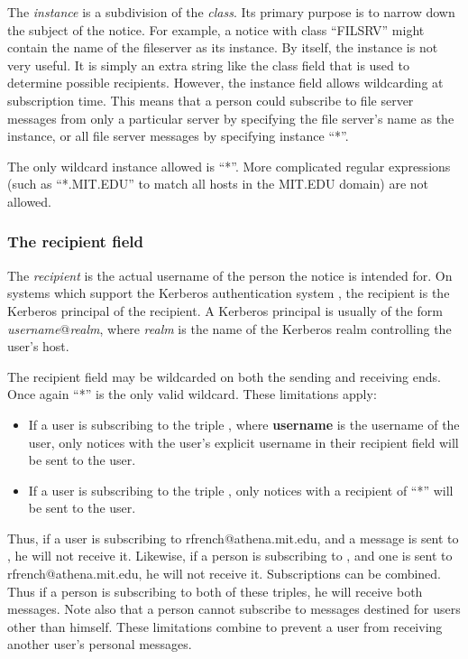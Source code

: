 The {\em instance\/} is a subdivision of the {\em class\/}.  Its primary
purpose is to narrow down the subject of the notice.  For example, a
notice with class ``FILSRV'' might contain the name of the fileserver
as its instance.  By itself, the instance is not very useful.  It is
simply an extra string like the class field that is used to determine
possible recipients.  However, the instance field allows wildcarding
at subscription time.  This means that a person could subscribe to
file server messages from only a particular server by specifying the
file server's name as the instance, or all file server messages by
specifying instance ``*''.

The only wildcard instance allowed is ``*''.  More complicated
regular expressions (such as ``*.MIT.EDU'' to match all hosts in the
MIT.EDU domain) are not allowed.

\subsubsection{The {\bf recipient} field}
\label{subscription-recipient}

The {\em recipient\/} is the actual username of the person the notice is
intended for.  On systems which support the Kerberos authentication
system \cite{kerberos-paper}, the recipient is the Kerberos principal
of the recipient.  A Kerberos principal is usually of the form {\em
username}@{\em realm}, where {\em realm\/} is the name of the
Kerberos realm controlling the user's host.

The recipient field may be wildcarded on both the sending and
receiving ends.  Once again ``*'' is the only valid wildcard.  These
limitations apply:

\begin{itemize}
\item If a user is subscribing to the triple , where {\bf username} is the username of
the user, only notices with the user's explicit username in their
recipient field will be sent to the user.

\item If a user is subscribing to the triple , only notices with a recipient of ``*'' will be
sent to the user.
\end{itemize}

Thus, if a user is subscribing to 
{rfrench@\sc athena.mit.edu}, and a message is sent to
, he will not receive it.  Likewise, if
a person is subscribing to
, and one is sent to  {rfrench@\sc athena.mit.edu}, he will not
receive it.  Subscriptions can be combined.  Thus if a person is
subscribing to both of these triples, he will receive both messages.
Note also that a person cannot subscribe to messages destined for
users other than himself.  These limitations combine to prevent a user
from receiving another user's personal messages.


